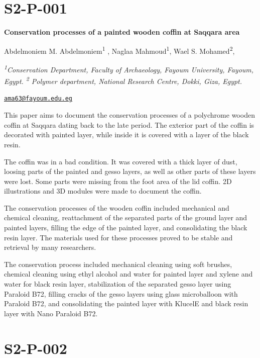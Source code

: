 \documentclass[
]{book}
\begin{document}
\hypertarget{s2-p-001}{%
\section*{S2-P-001}\label{s2-p-001}}

\textbf{Conservation processes of a painted wooden coffin at Saqqara area}

Abdelmoniem M. Abdelmoniem\textsuperscript{1} , Naglaa Mahmoud\textsuperscript{1}, Wael S. Mohamed\textsuperscript{2},

\textsuperscript{\emph{1}}\emph{Conservation Department, Faculty of Archaeology, Fayoum University, Fayoum, Egypt. \textsuperscript{2} Polymer department, National Research Centre, Dokki, Giza, Egypt.}

\href{mailto:ama63@fayoum.edu.eg}{\nolinkurl{ama63@fayoum.edu.eg}}

This paper aims to document the conservation processes of a polychrome wooden coffin at Saqqara dating back to the late period. The exterior part of the coffin is decorated with painted layer, while inside it is covered with a layer of the black resin.

The coffin was in a bad condition. It was covered with a thick layer of dust, loosing parts of the painted and gesso layers, as well as other parts of these layers were lost. Some parts were missing from the foot area of the lid coffin. 2D illustrations and 3D modules were made to document the coffin.

The conservation processes of the wooden coffin included mechanical and chemical cleaning, reattachment of the separated parts of the ground layer and painted layers, filling the edge of the painted layer, and consolidating the black resin layer. The materials used for these processes proved to be stable and retrieval by many researchers.

The conservation process included mechanical cleaning using soft brushes, chemical cleaning using ethyl alcohol and water for painted layer and xylene and water for black resin layer, stabilization of the separated gesso layer using Paraloid B72, filling cracks of the gesso layers using glass microballoon with Paraloid B72, and consolidating the painted layer with KlucelE and black resin layer with Nano Paraloid B72.

\hypertarget{s2-p-002}{%
\section*{S2-P-002}\label{s2-p-002}}
\end{document}
